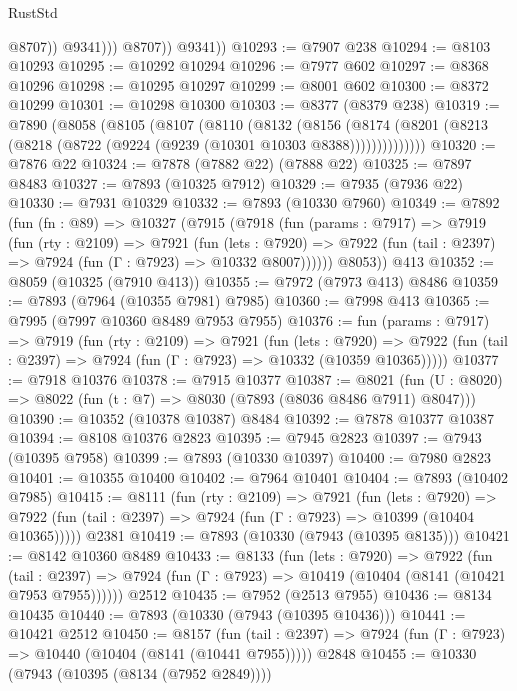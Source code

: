 \begin{lexlean}{RustStd}
\begin{coremodule}
{\begin{coremodule}
{{{{{{{{{{{{{{{{{{{{{{{{{{{{{{{{{{{{{{{{{{{{{{{{{{                      @8707))
                  @9341)))
            @8707))
        @9341))
@10293 := @7907 @238
@10294 := @8103 @10293
@10295 := @10292 @10294
@10296 := @7977 @602
@10297 := @8368 @10296
@10298 := @10295 @10297
@10299 := @8001 @602
@10300 := @8372 @10299
@10301 := @10298 @10300
@10303 := @8377 (@8379 @238)
@10319 := @7890
    (@8058
      (@8105
        (@8107
          (@8110
            (@8132
              (@8156
                (@8174 (@8201 (@8213 (@8218 (@8722 (@9224 (@9239 (@10301 @10303 @8388))))))))))))))
@10320 := @7876 @22
@10324 := @7878 (@7882 @22) (@7888 @22)
@10325 := @7897 @8483
@10327 := @7893 (@10325 @7912)
@10329 := @7935 (@7936 @22)
@10330 := @7931 @10329
@10332 := @7893 (@10330 @7960)
@10349 := @7892
    (fun (fn : @89) =>
    @10327
      (@7915
        (@7918
          (fun (params : @7917) =>
          @7919
            (fun (rty : @2109) =>
            @7921
              (fun (lets : @7920) =>
              @7922 (fun (tail : @2397) => @7924 (fun (Γ : @7923) => @10332 @8007))))))
        @8053))
    @413
@10352 := @8059 (@10325 (@7910 @413))
@10355 := @7972 (@7973 @413) @8486
@10359 := @7893 (@7964 (@10355 @7981) @7985)
@10360 := @7998 @413
@10365 := @7995 (@7997 @10360 @8489 @7953 @7955)
@10376 := fun (params : @7917) =>
  @7919
    (fun (rty : @2109) =>
    @7921
      (fun (lets : @7920) =>
      @7922 (fun (tail : @2397) => @7924 (fun (Γ : @7923) => @10332 (@10359 @10365)))))
@10377 := @7918 @10376
@10378 := @7915 @10377
@10387 := @8021 (fun (U : @8020) => @8022 (fun (t : @7) => @8030 (@7893 (@8036 @8486 @7911) @8047)))
@10390 := @10352 (@10378 @10387) @8484
@10392 := @7878 @10377 @10387
@10394 := @8108 @10376 @2823
@10395 := @7945 @2823
@10397 := @7943 (@10395 @7958)
@10399 := @7893 (@10330 @10397)
@10400 := @7980 @2823
@10401 := @10355 @10400
@10402 := @7964 @10401
@10404 := @7893 (@10402 @7985)
@10415 := @8111
    (fun (rty : @2109) =>
    @7921
      (fun (lets : @7920) =>
      @7922 (fun (tail : @2397) => @7924 (fun (Γ : @7923) => @10399 (@10404 @10365)))))
    @2381
@10419 := @7893 (@10330 (@7943 (@10395 @8135)))
@10421 := @8142 @10360 @8489
@10433 := @8133
    (fun (lets : @7920) =>
    @7922
      (fun (tail : @2397) =>
      @7924 (fun (Γ : @7923) => @10419 (@10404 (@8141 (@10421 @7953 @7955))))))
    @2512
@10435 := @7952 (@2513 @7955)
@10436 := @8134 @10435
@10440 := @7893 (@10330 (@7943 (@10395 @10436)))
@10441 := @10421 @2512
@10450 := @8157
    (fun (tail : @2397) => @7924 (fun (Γ : @7923) => @10440 (@10404 (@8141 (@10441 @7955)))))
    @2848
@10455 := @10330 (@7943 (@10395 (@8134 (@7952 @2849))))
}}}}}}}}}}}}}}}}}}}}}}}}}}}}}}}}}}}}}}}}}}}}}}}}}}
\end{coremodule}}
\end{coremodule}
\end{lexlean}
